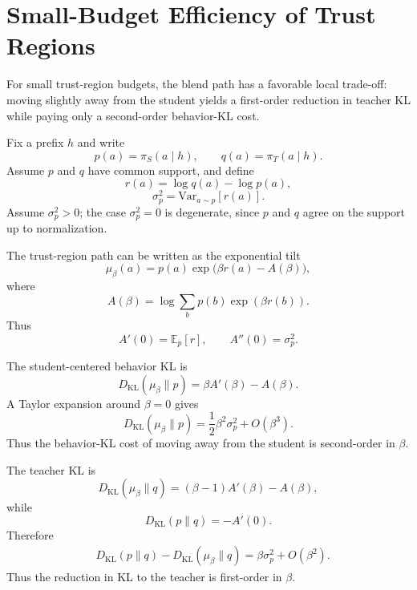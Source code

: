 \documentclass[11pt]{article}
\begin{document}
\section{Small-Budget Efficiency of Trust Regions}
\label{app:small_budget}

For small trust-region budgets, the blend path has a favorable local trade-off:
moving slightly away from the student yields a first-order reduction in teacher KL while paying only a second-order behavior-KL cost.

Fix a prefix $h$ and write
\[
p(a)=\pi_S(a\mid h),
\qquad
q(a)=\pi_T(a\mid h).
\]
Assume $p$ and $q$ have common support, and define
\[
r(a)=\log q(a)-\log p(a),
\]
\[
\sigma_p^2
=
\mathrm{Var}_{a\sim p}[r(a)].
\]
Assume $\sigma_p^2>0$; the case $\sigma_p^2=0$ is degenerate, since $p$ and $q$ agree on the support up to normalization.

The trust-region path can be written as the exponential tilt
\begin{equation}
\mu_\beta(a)
=
p(a)\exp\bigl(\beta r(a)-A(\beta)\bigr),
\end{equation}
where
\begin{equation}
A(\beta)
=
\log\sum_b p(b)\exp(\beta r(b)).
\end{equation}
Thus
\[
A'(0)=\mathbb{E}_p[r],
\qquad
A''(0)=\sigma_p^2.
\]

The student-centered behavior KL is
\begin{equation}
D_{\mathrm{KL}}(\mu_\beta\|p)
=
\beta A'(\beta)-A(\beta).
\end{equation}
A Taylor expansion around $\beta=0$ gives
\begin{equation}
D_{\mathrm{KL}}(\mu_\beta\|p)
=
\frac{1}{2}\beta^2\sigma_p^2
+
O(\beta^3).
\label{eq:small_beta_student_kl_app}
\end{equation}
Thus the behavior-KL cost of moving away from the student is second-order in $\beta$.

The teacher KL is
\begin{equation}
D_{\mathrm{KL}}(\mu_\beta\|q)
=
(\beta-1)A'(\beta)-A(\beta),
\end{equation}
while
\begin{equation}
D_{\mathrm{KL}}(p\|q)
=
-A'(0).
\end{equation}
Therefore
\begin{equation}
\begin{aligned}
&D_{\mathrm{KL}}(p\|q)
-
D_{\mathrm{KL}}(\mu_\beta\|q)
 =
\beta\sigma_p^2
+
O(\beta^2).
\end{aligned}
\label{eq:small_beta_teacher_gain_app}
\end{equation}
Thus the reduction in KL to the teacher is first-order in $\beta$.
\end{document}
